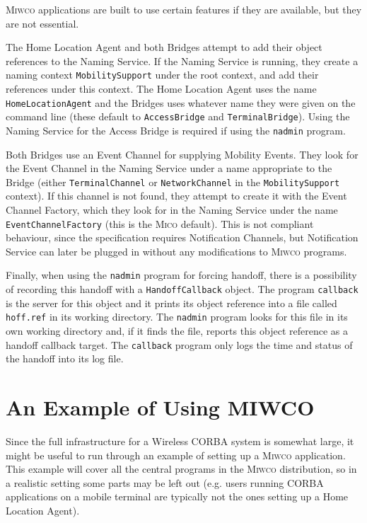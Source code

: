 \documentclass[12pt,a4paper,draft]{article}
\newcommand{\MICO}{\textsc{Mico}}
\newcommand{\MIWCO}{\textsc{Miwco}}
\begin{document}
\MIWCO{} applications are built to use certain features if they are
available, but they are not essential.

The Home Location Agent and both Bridges attempt to add their object
references to the Naming Service.  If the Naming Service is running,
they create a naming context \texttt{MobilitySupport} under the root
context, and add their references under this context.  The Home
Location Agent uses the name \texttt{HomeLocationAgent} and the
Bridges uses whatever name they were given on the command line (these
default to \texttt{AccessBridge} and \texttt{TerminalBridge}).  Using
the Naming Service for the Access Bridge is required if using the
\texttt{nadmin} program.

Both Bridges use an Event Channel for supplying Mobility Events.  They
look for the Event Channel in the Naming Service under a name
appropriate to the Bridge (either \texttt{TerminalChannel} or
\texttt{NetworkChannel} in the \texttt{MobilitySupport} context).  If
this channel is not found, they attempt to create it with the Event
Channel Factory, which they look for in the Naming Service under the
name \texttt{EventChannelFactory} (this is the \MICO{} default).  This
is not compliant behaviour, since the specification requires
Notification Channels, but Notification Service can later be plugged
in without any modifications to \MIWCO{} programs.

Finally, when using the \texttt{nadmin} program for forcing handoff,
there is a possibility of recording this handoff with a
\texttt{HandoffCallback} object.  The program \texttt{callback} is the
server for this object and it prints its object reference into a file
called \texttt{hoff.ref} in its working directory.  The
\texttt{nadmin} program looks for this file in its own working
directory and, if it finds the file, reports this object reference as
a handoff callback target.  The \texttt{callback} program only logs
the time and status of the handoff into its log file.


\section{An Example of Using MIWCO}
\label{sec:example}

Since the full infrastructure for a Wireless CORBA system is somewhat
large, it might be useful to run through an example of setting up a
\MIWCO{} application.  This example will cover all the central
programs in the \MIWCO{} distribution, so in a realistic setting some
parts may be left out (e.g. users running CORBA applications on a
mobile terminal are typically not the ones setting up a Home Location
Agent).
\end{document}
